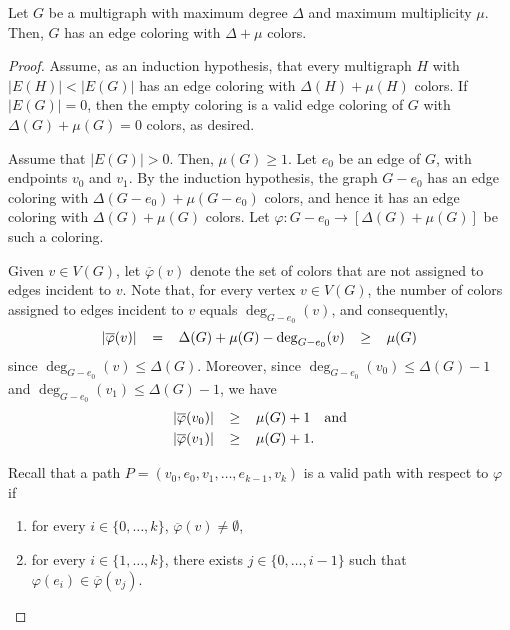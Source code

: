 \begin{proposition} \label{prop:hw2-ex4}
    Let \(G\) be a multigraph with maximum degree \(\Delta\) and maximum multiplicity \(\mu\).
    Then, \(G\) has an edge coloring with \(\Delta + \mu\) colors.
\end{proposition}

\begin{proof}
    Assume, as an induction hypothesis,
    that every multigraph \(H\) with \(|E(H)| < |E(G)|\)
    has an edge coloring with \(\Delta(H) + \mu(H)\) colors.
    If \(|E(G)| = 0\),
    then the empty coloring is a valid edge coloring of \(G\)
    with \(\Delta(G) + \mu(G) = 0\) colors,
    as desired.

    Assume that \(|E(G)| > 0\).
    Then, \(\mu(G) \geq 1\).
    Let \(e_0\) be an edge of \(G\),
    with endpoints \(v_0\) and \(v_1\).
    By the induction hypothesis,
    the graph \(G - e_0\) has an edge coloring
    with \(\Delta(G - e_0) + \mu(G - e_0)\) colors,
    and hence it has an edge coloring
    with \(\Delta(G) + \mu(G)\) colors.
    Let \(\varphi \colon G - e_0 \to [\Delta(G) + \mu(G)]\)
    be such a coloring.

    Given \(v \in V(G)\),
    let \(\overline\varphi(v)\) denote the
    set of colors that are not assigned to edges incident to \(v\).
    Note that,
    for every vertex \(v \in V(G)\),
    the number of colors assigned to edges incident to \(v\)
    equals \(\deg_{G - e_0}(v)\),
    and consequently,
    \begin{equation} \label{eq:overline-phi-v-mu}
        \thickmuskip=20mu
        |\overline\varphi(v)| = \Delta(G) + \mu(G) - \deg_{G - e_0}(v) \geq \mu(G)
    \end{equation}
    since \(\deg_{G - e_0}(v) \leq \Delta(G)\).
    Moreover, since \(\deg_{G - e_0}(v_0) \leq \Delta(G) - 1\)
    and \(\deg_{G - e_0}(v_1) \leq \Delta(G) - 1\),
    we have
    \begin{equation} \label{eq:overline-phi-v0-v1-mu}
        \thickmuskip=20mu
        \begin{aligned}
            |\overline\varphi(v_0)|  \geq \mu(G) + 1 & \quad \text{and} \\
            |\overline\varphi(v_1)|  \geq \mu(G) + 1 & .
        \end{aligned}
    \end{equation}

    Recall that a path \(P = (v_0, e_0, v_1, \dots, e_{k-1}, v_k)\)
    is a valid path with respect to \(\varphi\) if
    \begin{enumerate}[itemsep=0pt, topsep=0pt]
        \item for every \(i \in \{0, \dots, k\}\),
            \(\overline\varphi(v) \neq \emptyset\), \label{item:valid-path-missing-color}
        \item for every \(i \in \{1, \dots, k\}\),
            there exists \(j \in \{0, \dots, i-1\}\)
            such that \(\varphi(e_i) \in \overline\varphi(v_j)\). \label{item:valid-path-color-misses-before}
    \end{enumerate}


\end{proof}
